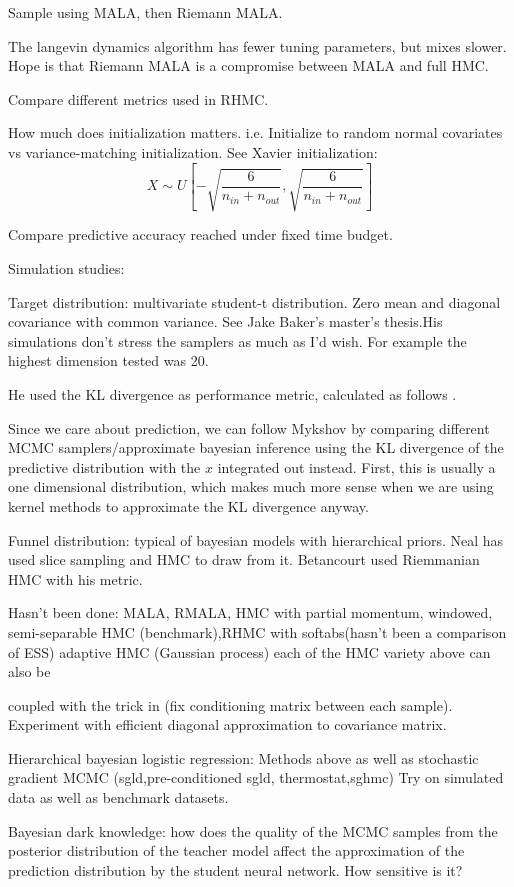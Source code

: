 \documentclass{book}
\begin{document}
\begin{enumerate}
Sample using MALA, then Riemann MALA.

The langevin dynamics algorithm has fewer tuning parameters, but mixes slower. Hope is that Riemann MALA is a compromise between MALA and full HMC. 

Compare different metrics used in RHMC. 

How much does initialization matters. i.e. Initialize to random normal covariates vs variance-matching initialization. See Xavier initialization: 
\[X \sim U[- \sqrt{\frac{6}{n_{in}+n_{out}}}, \sqrt{\frac{6}{n_{in}+n_{out}}}] \]

Compare predictive accuracy reached under fixed time budget.

Simulation studies: 

Target distribution: multivariate student-t distribution. Zero mean and diagonal covariance with common variance. See Jake Baker's master's thesis.His simulations don't stress the samplers as much as I'd wish. For example the highest dimension tested was 20. 

He used the KL divergence as performance metric, calculated as follows \cite{boltz2007high}. 

Since we care about prediction, we can follow Mykshov by comparing different MCMC samplers/approximate bayesian inference using the KL divergence of the predictive distribution with the $x$ integrated out instead. First, this is usually a one dimensional distribution, which makes much more sense when we are using kernel methods to approximate the KL divergence anyway.

Funnel distribution: typical of bayesian models with hierarchical priors. Neal has used slice sampling and HMC to draw from it. Betancourt used Riemmanian HMC with his metric. 

Hasn't been done: MALA, RMALA, HMC with partial momentum, windowed,
semi-separable HMC (benchmark),RHMC with softabs(hasn't been a comparison of
ESS) adaptive HMC (Gaussian process) each of the HMC variety above can also be

coupled with the trick in \cite{burda2011bayesian} (fix conditioning matrix
between each sample).
Experiment with efficient diagonal approximation to covariance matrix.

Hierarchical bayesian logistic regression: Methods above as well as stochastic
gradient MCMC (sgld,pre-conditioned sgld, thermostat,sghmc)
Try on simulated data as well as benchmark datasets.


Bayesian dark knowledge: how does the quality of the MCMC samples from the
posterior distribution of the teacher model affect the approximation of the
prediction distribution by the student neural network. How sensitive is it?



\end{enumerate}
\end{document}
